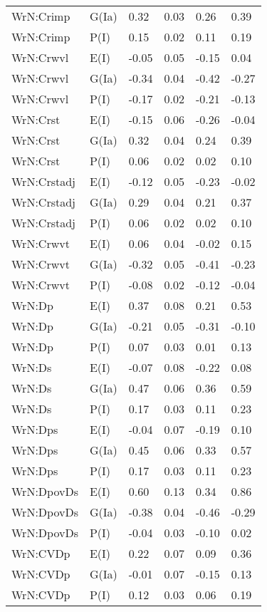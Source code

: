 \begin{center}
\begin{longtable}{|p{1.1in}|p{0.7in}|p{0.7in}|p{0.6in}|p{0.6in}|p{0.6in}|}
  WrN:Crimp & G(Ia) & 0.32 & 0.03 & 0.26 & 0.39 \\ 
  WrN:Crimp & P(I) & 0.15 & 0.02 & 0.11 & 0.19 \\ 
  WrN:Crwvl & E(I) & -0.05 & 0.05 & -0.15 & 0.04 \\ 
  WrN:Crwvl & G(Ia) & -0.34 & 0.04 & -0.42 & -0.27 \\ 
  WrN:Crwvl & P(I) & -0.17 & 0.02 & -0.21 & -0.13 \\ 
  WrN:Crst & E(I) & -0.15 & 0.06 & -0.26 & -0.04 \\ 
  WrN:Crst & G(Ia) & 0.32 & 0.04 & 0.24 & 0.39 \\ 
  WrN:Crst & P(I) & 0.06 & 0.02 & 0.02 & 0.10 \\ 
  WrN:Crstadj & E(I) & -0.12 & 0.05 & -0.23 & -0.02 \\ 
  WrN:Crstadj & G(Ia) & 0.29 & 0.04 & 0.21 & 0.37 \\ 
  WrN:Crstadj & P(I) & 0.06 & 0.02 & 0.02 & 0.10 \\ 
  WrN:Crwvt & E(I) & 0.06 & 0.04 & -0.02 & 0.15 \\ 
  WrN:Crwvt & G(Ia) & -0.32 & 0.05 & -0.41 & -0.23 \\ 
  WrN:Crwvt & P(I) & -0.08 & 0.02 & -0.12 & -0.04 \\ 
  WrN:Dp & E(I) & 0.37 & 0.08 & 0.21 & 0.53 \\ 
  WrN:Dp & G(Ia) & -0.21 & 0.05 & -0.31 & -0.10 \\ 
  WrN:Dp & P(I) & 0.07 & 0.03 & 0.01 & 0.13 \\ 
  WrN:Ds & E(I) & -0.07 & 0.08 & -0.22 & 0.08 \\ 
  WrN:Ds & G(Ia) & 0.47 & 0.06 & 0.36 & 0.59 \\ 
  WrN:Ds & P(I) & 0.17 & 0.03 & 0.11 & 0.23 \\ 
  WrN:Dps & E(I) & -0.04 & 0.07 & -0.19 & 0.10 \\ 
  WrN:Dps & G(Ia) & 0.45 & 0.06 & 0.33 & 0.57 \\ 
  WrN:Dps & P(I) & 0.17 & 0.03 & 0.11 & 0.23 \\ 
  WrN:DpovDs & E(I) & 0.60 & 0.13 & 0.34 & 0.86 \\ 
  WrN:DpovDs & G(Ia) & -0.38 & 0.04 & -0.46 & -0.29 \\ 
  WrN:DpovDs & P(I) & -0.04 & 0.03 & -0.10 & 0.02 \\ 
  WrN:CVDp & E(I) & 0.22 & 0.07 & 0.09 & 0.36 \\ 
  WrN:CVDp & G(Ia) & -0.01 & 0.07 & -0.15 & 0.13 \\ 
  WrN:CVDp & P(I) & 0.12 & 0.03 & 0.06 & 0.19 \\ 

\end{longtable}
\end{center}
